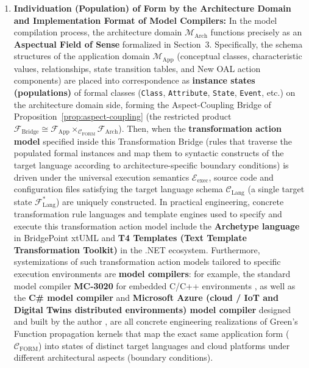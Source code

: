 \documentclass[11pt,a4paper]{article}
\theoremstyle{definition}
\theoremstyle{plain}
\theoremstyle{remark}
\newcommand{\CFORM}{\mathcal{C}_{\mathrm{FORM}}}
\newcommand{\Eexec}{\mathcal{E}_{\mathrm{exec}}}
\begin{document}
\begin{enumerate}
    \item \textbf{Individuation (Population) of Form by the Architecture Domain and Implementation Format of Model Compilers:}
    In the model compilation process, the architecture domain $\mathcal{M}_{\mathrm{Arch}}$ functions precisely as an \textbf{Aspectual Field of Sense} formalized in Section~3. Specifically, the schema structures of the application domain $\mathcal{M}_{\mathrm{App}}$ (conceptual classes, characteristic values, relationships, state transition tables, and New OAL action components) are placed into correspondence as \textbf{instance states (populations)} of formal classes (\texttt{Class}, \texttt{Attribute}, \texttt{State}, \texttt{Event}, etc.) on the architecture domain side, forming the Aspect-Coupling Bridge of Proposition~\ref{prop:aspect-coupling} (the restricted product $\mathcal{F}_{\mathrm{Bridge}} \cong \mathcal{F}_{\mathrm{App}} \times_{\CFORM} \mathcal{F}_{\mathrm{Arch}}$).
    Then, when the \textbf{transformation action model} specified inside this Transformation Bridge (rules that traverse the populated formal instances and map them to syntactic constructs of the target language according to architecture-specific boundary conditions) is driven under the universal execution semantics $\Eexec$, source code and configuration files satisfying the target language schema $\mathcal{C}_{\mathrm{Lang}}$ (a single target state $\mathcal{F}_{\mathrm{Lang}}^*$) are uniquely constructed.
    In practical engineering, concrete transformation rule languages and template engines used to specify and execute this transformation action model include the \textbf{Archetype language} in BridgePoint xtUML \cite{xtumlorg} and \textbf{T4 Templates (Text Template Transformation Toolkit)} in the .NET ecosystem. Furthermore, systemizations of such transformation action models tailored to specific execution environments are \textbf{model compilers}: for example, the standard model compiler \textbf{MC-3020} for embedded C/C++ environments \cite{mellor2002,xtumlorg}, as well as the \textbf{C\# model compiler} and \textbf{Microsoft Azure (cloud / IoT and Digital Twins distributed environments) model compiler} designed and built by the author \cite{ota2023azure}, are all concrete engineering realizations of Green's Function propagation kernels that map the exact same application form ($\CFORM$) into states of distinct target languages and cloud platforms under different architectural aspects (boundary conditions).


\end{enumerate}
\end{document}
